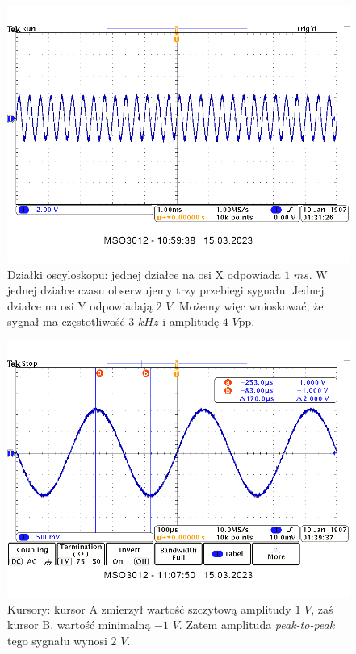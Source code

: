 \documentclass[14pt, table]{extarticle}
\begin{document}
\begin{figure}[H]
\includegraphics[scale=0.65]{A11}
\centering
\captionsetup{labelformat=empty}
\caption{Działki oscyloskopu: jednej działce na osi X odpowiada $1$ $ms$. W jednej działce czasu obserwujemy trzy przebiegi sygnału. Jednej działce na osi Y odpowiadają $2$ $V$. Możemy więc wnioskować, że sygnał ma częstotliwość $3$ $kHz$ i amplitudę $4$ $V$pp.}
\end{figure}

\newpage
\begin{figure}[H]
\includegraphics[scale=0.65]{A12}
\centering
\captionsetup{labelformat=empty}
\caption{Kursory: kursor A zmierzył wartość szczytową amplitudy $1$ $V$, zaś kursor B, wartość minimalną $-1$ $V$. Zatem amplituda \textit{peak-to-peak} tego sygnału wynosi $2$ $V$.}
\end{figure}
\end{document}

